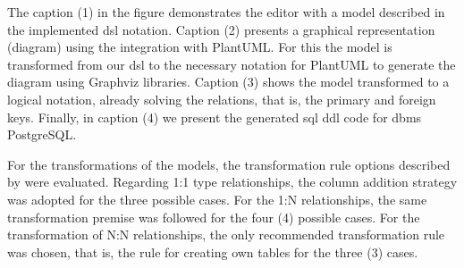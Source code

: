 The caption (1) in the figure demonstrates the editor with a model described in the implemented \ac{dsl} notation.
Caption (2) presents a graphical representation (diagram) using the integration with PlantUML.
For this the model is transformed from our \ac{dsl} to the necessary notation for PlantUML to generate the diagram using Graphviz libraries.
Caption (3) shows the model transformed to a logical notation, already solving the relations, that is, the primary and foreign keys.
Finally, in caption (4) we present the generated \ac{sql} \ac{ddl} code for \ac{dbms} PostgreSQL.

For the transformations of the models, the transformation rule options described by \cite{Heuser:2009} were evaluated.
Regarding 1:1 type relationships, the column addition strategy was adopted for the three possible cases.
For the 1:N relationships, the same transformation premise was followed for the four (4) possible cases.
For the transformation of N:N relationships, the only recommended transformation rule was chosen, that is, the rule for creating own tables for the three (3) cases.


